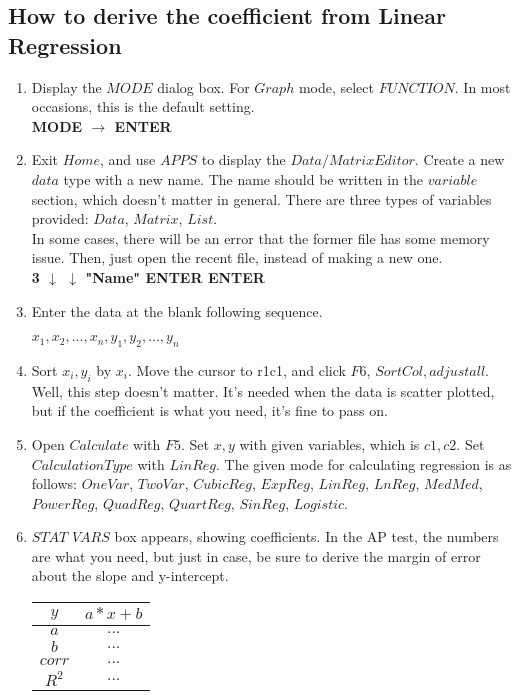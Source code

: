 \subsection{How to derive the coefficient from Linear Regression}
\begin{enumerate}
    \item Display the $MODE$ dialog box. For $Graph$ mode, select $FUNCTION$. In most occasions, this is the default setting.\\
    \textbf{MODE $\rightarrow$ ENTER}
    
    \item Exit $Home$, and use $APPS$ to display the $Data/Matrix Editor$. Create a new $data$ type with a new name. The name should be written in the $variable$ section, which doesn't matter in general. There are three types of variables provided: $Data$, $Matrix$, $List$.\\
    In some cases, there will be an error that the former file has some memory issue. Then, just open the recent file, instead of making a new one.\\
    \textbf{3 $\downarrow$ $\downarrow$ "Name" ENTER ENTER}
    
    \item Enter the data at the blank following sequence.
    \begin{center}
        $x_1 , x_2 , ..., x_n , y_1 , y_2 , ..., y_n$
    \end{center}

    \item Sort $x_i , y_i$ by $x_i$. Move the cursor to r1c1, and click $F6$, $Sort Col, adjust all$. Well, this step doesn't matter. It's needed when the data is scatter plotted, but if the coefficient is what you need, it's fine to pass on.

    \item Open $Calculate$ with $F5$. Set $x, y$ with given variables, which is $c1, c2$. Set $Calculation Type$ with $LinReg$. The given mode for calculating regression is as follows: $OneVar$, $TwoVar$, $CubicReg$, $ExpReg$, $LinReg$, $LnReg$, $MedMed$, $PowerReg$, $QuadReg$, $QuartReg$, $SinReg$, $Logistic$.

    \item $STAT$ $VARS$ box appears, showing coefficients. In the AP test, the numbers are what you need, but just in case, be sure to derive the margin of error about the slope and y-intercept.
    
    \begin{table}[h]
        \centering
        \begin{tabular}{|c|c|}
        \hline
             $y$ & $a*x + b$\\ \hline\hline
             $a$ & $ ...$\\
             $b$ & $...$\\
             $corr$ & $...$\\
             $R^2$ & $...$\\ \hline
        \end{tabular}
        \label{LinearRegression STAT VARS}
    \end{table}

    
\end{enumerate}